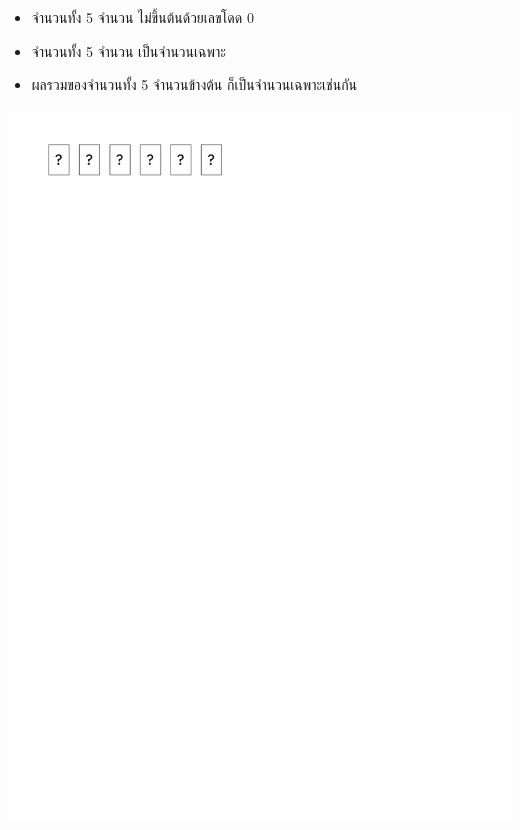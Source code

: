 \begin{minipage}{0.5\linewidth}
    \begin{itemize}[topsep=0pc,itemsep=0pc,leftmargin=0pc]
        \item  จำนวนทั้ง 5 จำนวน ไม่ขึ้นต้นด้วยเลขโดด 0
        \item  จำนวนทั้ง 5 จำนวน เป็นจำนวนเฉพาะ
        \item  ผลรวมของจำนวนทั้ง 5 จำนวนข้างต้น ก็เป็นจำนวนเฉพาะเช่นกัน
    \end{itemize}
    \vspace*{6pc}
\end{minipage}
\begin{minipage}{0.425\linewidth}
    \begin{center}
        \includegraphics[page=6]{figures/puzzle.pdf}
    \end{center}    
\end{minipage}